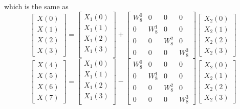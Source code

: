 \documentclass[journal,12pt,twocolumn]{IEEEtran}
\renewcommand\thesection{\arabic{section}}
\begin{document}
\begin{enumerate}[label=\arabic*.,ref=\thesection.\theenumi]
    which is the same as
    \begin{equation}
\begin{bmatrix}
X(0) \\ 
X(1) \\ 
X(2) \\ 
X(3)
\end{bmatrix}
=
\begin{bmatrix}
X_{1}(0) \\ 
X_{1}(1)\\ 
X_{1}(2)\\
X_{1}(3)\\
\end{bmatrix}
+
\begin{bmatrix}
W^{0}_{8} & 0 & 0 & 0\\
0 & W^{1}_{8} & 0 & 0\\
0 & 0 & W^{2}_{8} & 0\\
0 & 0 & 0 & W^{3}_{8}
\end{bmatrix}
\begin{bmatrix}
X_{2}(0) \\ 
X_{2}(1) \\ 
X_{2}(2) \\
X_{2}(3)
\end{bmatrix}
\end{equation}
\begin{equation}
\begin{bmatrix}
X(4) \\ 
X(5) \\ 
X(6) \\ 
X(7)
\end{bmatrix}
=
\begin{bmatrix}
X_{1}(0) \\ 
X_{1}(1)\\ 
X_{1}(2)\\
X_{1}(3)\\
\end{bmatrix}
-
\begin{bmatrix}
W^{0}_{8} & 0 & 0 & 0\\
0 & W^{1}_{8} & 0 & 0\\
0 & 0 & W^{2}_{8} & 0\\
0 & 0 & 0 & W^{3}_{8}
\end{bmatrix}
\begin{bmatrix}
X_{2}(0) \\ 
X_{2}(1) \\ 
X_{2}(2) \\
X_{2}(3)
\end{bmatrix}
\end{equation}


\end{enumerate}
\end{document}
